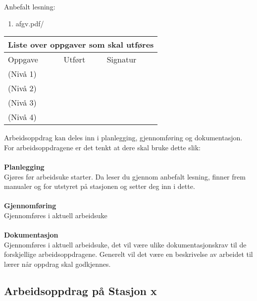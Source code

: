 Anbefalt lesning:

\begin{enumerate}
	\item afgv.pdf/ 
\end{enumerate}


\begin{center}
\begin{tabular}{ | m{10cm} | m{1cm}| m{2cm} | } 
\hline
\multicolumn{3}{|c|}{Liste over oppgaver som skal utføres} \\
	\hline
	Oppgave	& Utført & Signatur \\ 
	\hline
	\hline
	\cellcolor{green!60}(Nivå 1)	& & \\ 
	\hline
	\cellcolor{yellow!60}(Nivå 2)	& & \\ 
	\hline
	\cellcolor{orange!60}(Nivå 3)	& & \\ 
	\hline
	\cellcolor{red!60}(Nivå 4)	& & \\ 
	\hline
\end{tabular}
\end{center}

Arbeidsoppdrag kan deles inn i planlegging, gjennomføring og dokumentasjon.\\
For arbeidsoppdragene er det tenkt at dere skal bruke dette slik:\\\\
\textbf{Planlegging}\\
Gjøres før arbeidsuke starter. Da leser du gjennom anbefalt lesning, finner frem manualer og for  utstyret på stasjonen og setter deg inn i dette.\\ \\
\textbf{Gjennomføring}\\
Gjennomføres i aktuell arbeidsuke\\\\

\textbf{Dokumentasjon}\\
Gjennomføres i aktuell arbeidsuke, det vil være ulike dokumentasjonskrav til de forskjellige arbeidsoppdragene. Generelt vil det være en beskrivelse av arbeidet til lærer når oppdrag skal godkjennes. \\


\newpage
\subsection*{Arbeidsoppdrag på Stasjon x}


